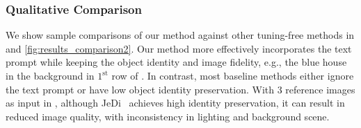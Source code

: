 \begin{table}[!t]
\centering
\setlength{\tabcolsep}{5pt}
\vspace{-8pt}
\caption{ \textbf{Human preference study.} Here, we compare the pairwise preference of our method against the competing methods from , i.e., Emu-2~\cite{Emu2} with the same model scale and JeDi~\cite{zeng2024jedi}. The standard error for all is within $\pm 5\%$. %
}

\label{tbl:human_eval}
\vspace{-12pt}
\end{table}




\subsubsection{Qualitative Comparison}
We show sample comparisons of our method against other tuning-free methods in  and \ref{fig:results_comparison2}. Our method more effectively incorporates the text prompt while keeping the object identity and image fidelity, e.g., the blue house in the background in $1^{\text{st}}$ row of . In contrast, most baseline methods either ignore the text prompt or have low object identity preservation. With $3$ reference images as input in , although JeDi~\cite{zeng2024jedi} achieves high identity preservation, it can result in reduced image quality, with inconsistency in lighting and background scene. 












